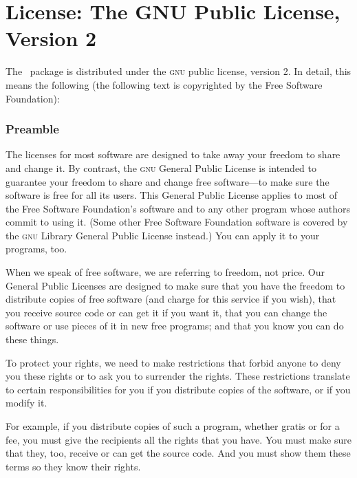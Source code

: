 
%


\section{License: The GNU Public License, Version 2}
\label{section-license}

The \pgfname\ package is distributed under the \textsc{gnu} public
license, version 2. In detail, this means the following (the following
text is copyrighted by the Free Software Foundation):

\subsubsection{Preamble}

The licenses for most software are designed to take away your freedom to
share and change it.  By contrast, the \textsc{gnu} General Public License is
intended to guarantee your freedom to share and change free software---to
make sure the software is free for all its users.  This General Public
License applies to most of the Free Software Foundation's software and to
any other program whose authors commit to using it.  (Some other Free
Software Foundation software is covered by the \textsc{gnu} Library General Public
License instead.)  You can apply it to your programs, too.

When we speak of free software, we are referring to freedom, not price.
Our General Public Licenses are designed to make sure that you have the
freedom to distribute copies of free software (and charge for this service
if you wish), that you receive source code or can get it if you want it,
that you can change the software or use pieces of it in new free programs;
and that you know you can do these things.

To protect your rights, we need to make restrictions that forbid anyone to
deny you these rights or to ask you to surrender the rights.  These
restrictions translate to certain responsibilities for you if you
distribute copies of the software, or if you modify it.

For example, if you distribute copies of such a program, whether gratis or
for a fee, you must give the recipients all the rights that you have.  You
must make sure that they, too, receive or can get the source code.  And
you must show them these terms so they know their rights.

